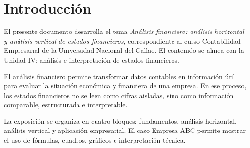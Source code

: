 \section{Introducción}

El presente documento desarrolla el tema \textit{Análisis financiero: análisis horizontal y análisis vertical de estados financieros}, correspondiente al curso Contabilidad Empresarial de la Universidad Nacional del Callao. El contenido se alinea con la Unidad IV: análisis e interpretación de estados financieros.

El análisis financiero permite transformar datos contables en información útil para evaluar la situación económica y financiera de una empresa. En ese proceso, los estados financieros no se leen como cifras aisladas, sino como información comparable, estructurada e interpretable.

La exposición se organiza en cuatro bloques: fundamentos, análisis horizontal, análisis vertical y aplicación empresarial. El caso Empresa ABC permite mostrar el uso de fórmulas, cuadros, gráficos e interpretación técnica.
